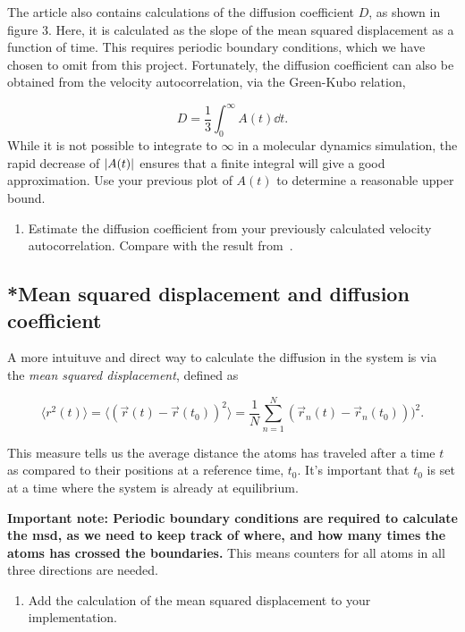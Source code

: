 \documentclass[11pt,english,a4paper]{report}
\begin{document}
The article also contains calculations of the diffusion coefficient
\(D\), as shown in figure 3. Here, it is calculated as the slope of
the mean squared displacement as a function of time. This requires
periodic boundary conditions, which we have chosen to omit from this
project. Fortunately, the diffusion coefficient can also be obtained
from the velocity autocorrelation, via the Green-Kubo relation,

\[
    D = \frac{1}{3}\int_0^\infty A(t)\dd{t}.
\]
While it is not possible to integrate to \(\infty\) in a molecular dynamics simulation, the rapid decrease of \(\abs{A(t)}\) ensures that a finite integral will give a good approximation. Use your previous plot of \(A(t)\) to determine a reasonable upper bound.

\begin{enumerate}[label=\roman*.,resume]
    \item Estimate the diffusion coefficient from your previously calculated velocity autocorrelation. Compare with the result from~\cite{Rahman_1964}.
\end{enumerate}


\subsection{*Mean squared displacement and diffusion coefficient}

A more intuituve and direct way to calculate the diffusion in the
system is via the \textit{mean squared displacement}, defined as

\begin{equation}
 \langle r^2(t) \rangle = \langle (\vec{r}(t) - \vec{r}(t_0))^2 \rangle = \frac{1}{N} \sum_{n=1}^N (\vec{r}_n(t) - \vec{r}_n(t_0)))^2.
 \label{eq:msd}
\end{equation}

This measure tells us the average distance the atoms has traveled
after a time $t$ as compared to their positions at a reference time,
$t_0$. It's important that $t_0$ is set at a time where the system is
already at equilibrium.

\textbf{Important note: Periodic boundary conditions are required to
  calculate the msd, as we need to keep track of where, and how many
  times the atoms has crossed the boundaries.} This means counters for
all atoms in all three directions are needed.

\begin{enumerate}[label=\roman*.]
    \item Add the calculation of the mean squared displacement to your implementation.
\end{enumerate}
\end{document}
